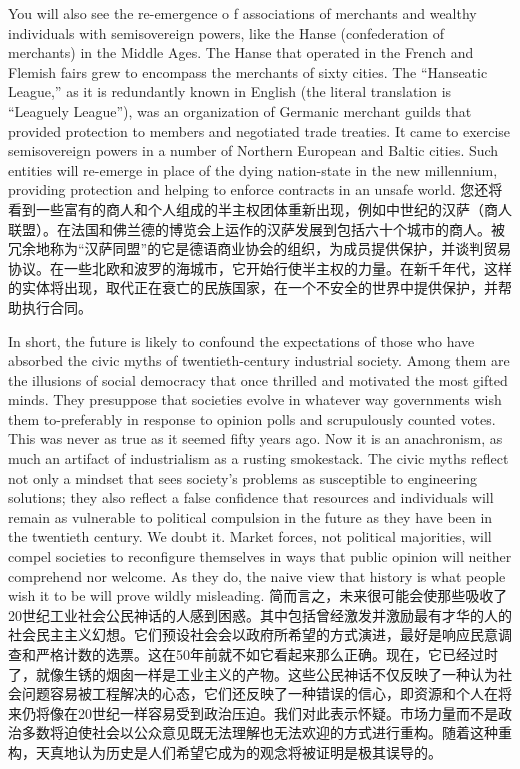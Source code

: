 \begin{Parallel}{97mm}{45mm}
  \ParallelLText
  {You will also see the re-emergence o f associations of merchants and wealthy individuals with semisovereign powers, like the Hanse (confederation of merchants) in the Middle Ages. The Hanse that operated in the French and Flemish fairs grew to encompass the merchants of sixty cities. The “Hanseatic League,” as it is redundantly known in English (the literal translation is “Leaguely League”), was an organization of Germanic merchant guilds that provided protection to members and negotiated trade treaties. It came to exercise semisovereign powers in a number of Northern European and Baltic cities. Such entities will re-emerge in place of the dying nation-state in the new millennium, providing protection and helping to enforce contracts in an unsafe world.}  
  \ParallelRText
  {\small 您还将看到一些富有的商人和个人组成的半主权团体重新出现，例如中世纪的汉萨（商人联盟）。在法国和佛兰德的博览会上运作的汉萨发展到包括六十个城市的商人。被冗余地称为“汉萨同盟”的它是德语商业协会的组织，为成员提供保护，并谈判贸易协议。在一些北欧和波罗的海城市，它开始行使半主权的力量。在新千年代，这样的实体将出现，取代正在衰亡的民族国家，在一个不安全的世界中提供保护，并帮助执行合同。}
  \ParallelPar

  \ParallelLText
  {In short, the future is likely to confound the expectations of those who have absorbed the civic myths of twentieth-century industrial society. Among them are the illusions of social democracy that once thrilled and motivated the most gifted minds. They presuppose that societies evolve in whatever way governments wish them to-preferably in response to opinion polls and scrupulously counted votes. This was never as true as it seemed fifty years ago. Now it is an anachronism, as much an artifact of industrialism as a rusting smokestack. The civic myths reflect not only a mindset that sees society's problems as susceptible to engineering solutions; they also reflect a false confidence that resources and individuals will remain as vulnerable to political compulsion in the future as they have been in the twentieth century. We doubt it. Market forces, not political majorities, will compel societies to reconfigure themselves in ways that public opinion will neither comprehend nor welcome. As they do, the naive view that history is what people wish it to be will prove wildly misleading.  }  
  \ParallelRText
  {\small 简而言之，未来很可能会使那些吸收了20世纪工业社会公民神话的人感到困惑。其中包括曾经激发并激励最有才华的人的社会民主主义幻想。它们预设社会会以政府所希望的方式演进，最好是响应民意调查和严格计数的选票。这在50年前就不如它看起来那么正确。现在，它已经过时了，就像生锈的烟囱一样是工业主义的产物。这些公民神话不仅反映了一种认为社会问题容易被工程解决的心态，它们还反映了一种错误的信心，即资源和个人在将来仍将像在20世纪一样容易受到政治压迫。我们对此表示怀疑。市场力量而不是政治多数将迫使社会以公众意见既无法理解也无法欢迎的方式进行重构。随着这种重构，天真地认为历史是人们希望它成为的观念将被证明是极其误导的。}
  \ParallelPar



\end{Parallel}
